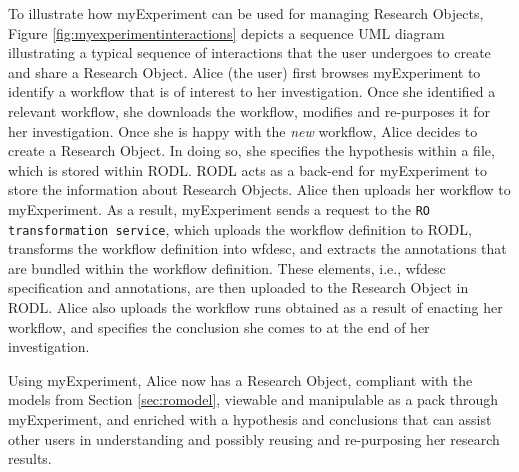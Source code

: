 To illustrate how myExperiment can be used for managing Research Objects, Figure \ref{fig:myexperimentinteractions} depicts a sequence UML diagram illustrating a typical sequence of interactions that the user undergoes to create and share a Research Object. Alice (the user) first browses myExperiment to identify a workflow that is of interest to her investigation. Once she identified a relevant workflow, she downloads the workflow, modifies and re-purposes it for her investigation. Once she is happy with the \emph{new} workflow, Alice decides to create a Research Object. In doing so, she specifies the hypothesis within a file, which is stored within RODL. RODL acts as a back-end for myExperiment to store the information about Research Objects. Alice then uploads her workflow to myExperiment. As a result, myExperiment sends a request to the \texttt{RO transformation service}, which uploads the workflow definition to RODL, transforms the workflow definition into wfdesc, and extracts the annotations that are bundled within the workflow definition. These elements, i.e., wfdesc specification and annotations, are then uploaded to the Research Object in RODL. Alice also uploads the workflow runs obtained as a result of enacting her workflow, and specifies the conclusion she comes to at the end of her investigation. 

Using myExperiment, Alice now has a Research Object, compliant with the models from Section \ref{sec:romodel}, viewable and manipulable as a pack through myExperiment, and enriched with a hypothesis and conclusions that can assist other users in understanding and possibly reusing and re-purposing her research results.

